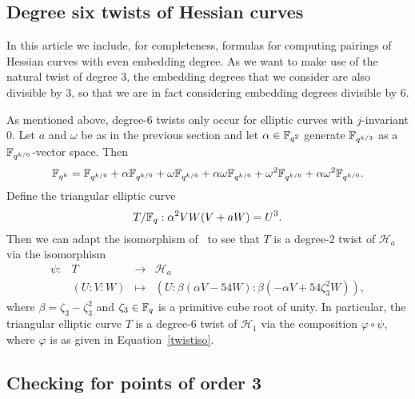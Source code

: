 \subsection{Degree six twists of Hessian curves}\label{sextic}

In this article we include, for completeness, formulas for computing pairings
of Hessian curves with even embedding degree. 
As we want to make use of the natural twist of degree 3, 
the embedding degrees that we consider are also divisible by 3, 
so that we are in fact considering embedding degrees divisible by 6.

As mentioned above, degree-6 twists only occur for elliptic curves
with $j$-invariant 0. 
Let $a$ and $\omega$ be as in the previous section
and let $\alpha \in \mathbb{F}_{q^2}$ generate $\mathbb{F}_{q^{k/3}}$ as a 
$\mathbb{F}_{q^{k/6}}$-vector space. Then
\[\mathbb{F}_{q^k} = \mathbb{F}_{q^{k/6}} + \alpha\mathbb{F}_{q^{k/6}} 
+\omega\mathbb{F}_{q^{k/6}} + \alpha\omega\mathbb{F}_{q^{k/6}}
+\omega^2\mathbb{F}_{q^{k/6}} + \alpha\omega^2\mathbb{F}_{q^{k/6}}.\] 
Define the triangular elliptic curve
\[T/\mathbb{F}_{q} : \alpha^2 VW(V + aW) = U^3.\]
Then we can adapt the isomorphism of~\cite[Theorem 5.3]{2015/hessian}
to see that $T$ is a degree-2 twist of $\mathcal{H}_a$ via
the isomorphism
\begin{equation}\label{quadtwist}
\begin{array}{rccc}
\psi: & T & \rightarrow & \mathcal{H}_a \\ 
& (U:V:W) & \mapsto &
(U:\beta(\alpha V - 54W) : \beta(-\alpha V + 54\zeta_3^2 W)),
\end{array}
\end{equation}
where $\beta = \zeta_3-\zeta_3^2$ and 
$\zeta_3 \in \mathbb{F}_{q}$ is a primitive cube root of unity.
In particular, the triangular elliptic curve $T$ is a degree-6 twist of $\mathcal{H}_1$ via the composition $\varphi \circ \psi$,
where $\varphi$ is as given in Equation~\ref{twistiso}.

\subsection{Checking for points of order 3}\label{twist}

